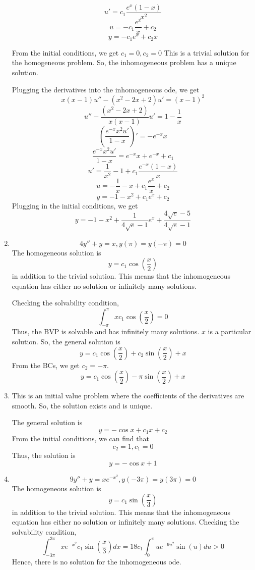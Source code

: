 \documentclass[letterpaper,12pt]{article}
\begin{document}
\begin{enumerate}
			\[u'=   c_1\frac{e^x(1-x)}{x^2} \]
				\[u= -c_1 \frac{e^x}{x} + c_2 \]
				\[y = - c_1 e^x + c_2 x\]

	From the initial conditions, we get $c_1 =0, c_2 = 0 $
 This is a trivial solution for the homogeneous problem. So, the inhomogeneous problem has a unique solution.

 Plugging the derivatives into the inhomogeneous ode, we get
 	\[ x(x-1)u''-(x^2-2x+2)u' = (x-1)^2\]
	 	\[ u''-\frac{(x^2-2x+2)}{x(x-1)}u' = 1 - \frac{1}{x}\]
			\[ (\frac{e^{-x}x^2u'}{1-x})' =-e^{-x}x\]
		\[ \frac{e^{-x}x^2u'}{1-x} =e^{-x}x+e^{-x}+c_1 \]
				\[ u'=\frac{1}{x^2} -1 +c_1 \frac{e^{-x}(1-x)}{x}\]
								\[ u =-\frac{1}{x} -x +c_1 \frac{e^{x}}{x}+c_2\]
								\[ y =-1 -x^2 +c_1 e^{x}+c_2\]
				Plugging in the initial conditions, we get
				\[ y =-1 -x^2 +\frac{1}{4\sqrt{e}-1} e^{x}+\frac{4\sqrt{e}-5}{4\sqrt{e}-1}\]
 \item
\[ 4 y'' +y=x , y(\pi)= y(-\pi)=0\]
The homogeneous solution is
\[y =  c_1 \cos(\frac{x}{2})\]
in addition to the trivial solution. This means that the inhomogeneous equation has either no solution or infinitely many solutions.

Checking the solvability condition,
\[\int_{-\pi}^{\pi } x c_1 \cos(\frac{x}{2}) = 0\]
Thus, the BVP is solvable and has infinitely many solutions. $x$ is a particular solution. So, the general solution is
\[y =  c_1 \cos(\frac{x}{2}) + c_2 \sin(\frac{x}{2})+ x \]
From the BCs, we get $c_2 = - \pi$.
\[y =  c_1 \cos(\frac{x}{2}) -\pi  \sin(\frac{x}{2})+ x \]


 \item
  This is an initial value problem where the coefficients of the derivatives are smooth. So, the solution exists and is unique.

	The general solution is
	\[y = -\cos x +c_1 x +c_2\]
	From the initial conditions, we can find that
	\[c_2 =1, c_1 =0\]
	Thus, the solution is
	\[y = -\cos x +1\]
	\item
	\[9y''+y = xe^{-x^2}, y(-3\pi)=y(3\pi)=0\]
	The homogeneous solution is
	\[y = c_1 \sin(\frac{x}{3})\]
	in addition to the trivial solution. This means that the inhomogeneous equation has either no solution or infinitely many solutions.
Checking the solvability condition,
	\[\int_{-3\pi}^{3\pi } x e^{-x^2}c_1 \sin(\frac{x}{3}) dx =18 c_1 \int_{0}^{\pi } u e^{-9u^2}\sin(u) du > 0  \]
	Hence, there is no solution for the inhomogeneous ode.
\end{enumerate}
\end{document}
